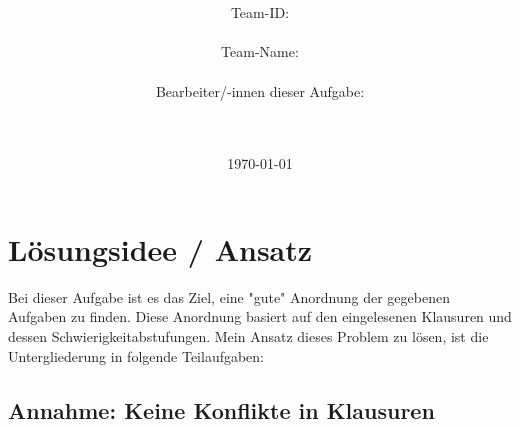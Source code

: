 \documentclass[a4paper,10pt,ngerman]{scrartcl}
\title{\textbf{\Huge\Aufgabe}}
\author{\LARGE Team-ID: \LARGE \TeamId \\\\
	    \LARGE Team-Name: \LARGE \TeamName \\\\
	    \LARGE Bearbeiter/-innen dieser Aufgabe: \\ 
	    \LARGE \Namen\\\\}
\date{\LARGE\today}
\begin{document}
\maketitle
\tableofcontents

\vspace{0.5cm}

\section{Lösungsidee / Ansatz}

Bei dieser Aufgabe ist es das Ziel, eine "gute" Anordnung der gegebenen Aufgaben zu finden. Diese Anordnung basiert auf den eingelesenen
Klausuren und dessen Schwierigkeitabstufungen. Mein Ansatz dieses Problem zu lösen, ist die Untergliederung in folgende Teilaufgaben:

\subsection{Annahme: Keine Konflikte in Klausuren}
\end{document}
